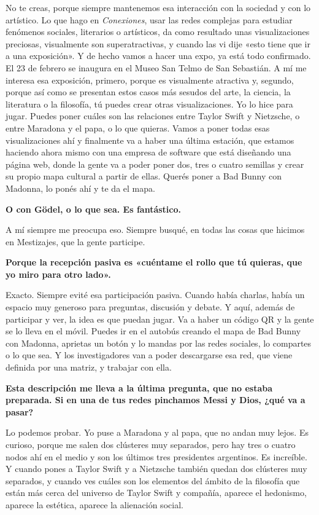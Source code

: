 \documentclass[11pt,a4paper]{article}
\newcommand{\preg}[1]{\textbf{#1}}
\begin{document}
No te creas, porque siempre mantenemos esa interacción con la sociedad y con lo artístico. Lo que hago en \emph{Conexiones}, usar las redes complejas para estudiar fenómenos sociales, literarios o artísticos, da como resultado unas visualizaciones preciosas, visualmente son superatractivas, y cuando las vi dije «esto tiene que ir a una exposición». Y de hecho vamos a hacer una expo, ya está todo confirmado. El 23 de febrero se inaugura en el Museo San Telmo de San Sebastián. A mí me interesa esa exposición, primero, porque es visualmente atractiva y, segundo, porque así como se presentan estos casos más sesudos del arte, la ciencia, la literatura o la filosofía, tú puedes crear otras visualizaciones. Yo lo hice para jugar. Puedes poner cuáles son las relaciones entre Taylor Swift y Nietzsche, o entre Maradona y el papa, o lo que quieras. Vamos a poner todas esas visualizaciones ahí y finalmente va a haber una última estación, que estamos haciendo ahora mismo con una empresa de software que está diseñando una página web, donde la gente va a poder poner dos, tres o cuatro semillas y crear su propio mapa cultural a partir de ellas. Querés poner a Bad Bunny con Madonna, lo ponés ahí y te da el mapa.

\preg{O con Gödel, o lo que sea. Es fantástico.}

A mí siempre me preocupa eso. Siempre busqué, en todas las cosas que hicimos en Mestizajes, que la gente participe.

\preg{Porque la recepción pasiva es «cuéntame el rollo que tú quieras, que yo miro para otro lado».}

Exacto. Siempre evité esa participación pasiva. Cuando había charlas, había un espacio muy generoso para preguntas, discusión y debate. Y aquí, además de participar y ver, la idea es que puedan jugar. Va a haber un código QR y la gente se lo lleva en el móvil. Puedes ir en el autobús creando el mapa de Bad Bunny con Madonna, aprietas un botón y lo mandas por las redes sociales, lo compartes o lo que sea. Y los investigadores van a poder descargarse esa red, que viene definida por una matriz, y trabajar con ella.

\preg{Esta descripción me lleva a la última pregunta, que no estaba preparada. Si en una de tus redes pinchamos Messi y Dios, ¿qué va a pasar?}

Lo podemos probar. Yo puse a Maradona y al papa, que no andan muy lejos. Es curioso, porque me salen dos clústeres muy separados, pero hay tres o cuatro nodos ahí en el medio y son los últimos tres presidentes argentinos. Es increíble. Y cuando pones a Taylor Swift y a Nietzsche también quedan dos clústeres muy separados, y cuando ves cuáles son los elementos del ámbito de la filosofía que están más cerca del universo de Taylor Swift y compañía, aparece el hedonismo, aparece la estética, aparece la alienación social.
\end{document}
